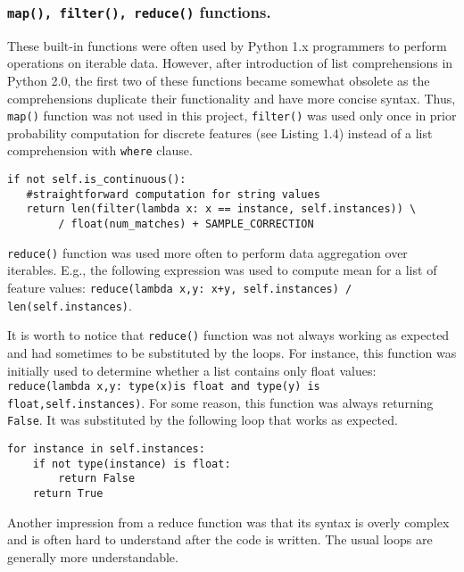 \documentclass{llncs}
\begin{document}
\subsubsection{\lstinline{map(), filter(), reduce()} functions.}

These built-in functions were often used by Python 1.x programmers to perform operations on iterable data. However, after introduction of list comprehensions in Python 2.0, the first two of these functions became somewhat obsolete as the comprehensions duplicate their functionality and have more concise syntax. Thus, \lstinline{map()} function was not used in this project, \lstinline{filter()} was used only once in prior probability computation for discrete features (see Listing 1.4) instead of a list comprehension with \lstinline{where} clause. 

\begin{lstlisting}[caption = Usage of filter function.]
if not self.is_continuous():
   #straightforward computation for string values
   return len(filter(lambda x: x == instance, self.instances)) \
    	/ float(num_matches) + SAMPLE_CORRECTION
\end{lstlisting}

\lstinline{reduce()} function was used more often to perform data aggregation over iterables. E.g., the following expression was used to compute mean for a list of feature values: \lstinline{reduce(lambda x,y: x+y, self.instances) / len(self.instances)}. 

It is worth to notice that \lstinline{reduce()} function was not always working as expected and had sometimes to be substituted by the loops. For instance, this function was initially used to determine whether a list contains only float values: \lstinline{reduce(lambda x,y: type(x)is float and type(y) is float,self.instances)}. For some reason, this function was always returning \lstinline{False}. It was substituted by the following loop that works as expected.

\begin{lstlisting}[caption = A loop determining whether the list contains only floats.]
for instance in self.instances:
    if not type(instance) is float:
        return False
    return True
\end{lstlisting}

Another impression from a reduce function was that its syntax is overly complex and is often hard to understand after the code is written. The usual loops are generally more understandable.
\end{document}
